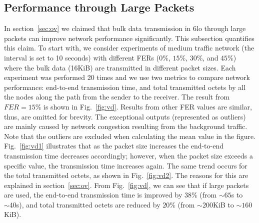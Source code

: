 \documentclass[runningheads,a4paper]{llncs}
\begin{document}
\subsection{Performance through Large Packets} \label{sec:vd}
In section~\ref{sec:ov} we claimed that bulk data transmission in 6lo through large packets can improve network performance significantly. This subsection quantifies this claim. To start with, we consider experiments of medium traffic network (the interval is set to 10 seconds) with different FERs ($0\%$, $15\%$, $30\%$, and $45\%$) where the bulk data (16KiB) are transmitted in different packet sizes. Each experiment was performed 20 times and we use two metrics to compare network performance: end-to-end transmission time, and total transmitted octets by all the nodes along the path from the sender to the receiver. The result from $FER=15\%$ is shown in Fig.~\ref{fig:vd}. Results from other FER values are similar, thus, are omitted for brevity. The exceptional outputs (represented as outliers) are mainly caused by network congestion resulting from the background traffic. Note that the outliers are excluded when calculating the mean value in the figure. Fig.~\ref{fig:vd1} illustrates that as the packet size increases the end-to-end transmission time decreases accordingly; however, when the packet size exceeds a specific value, the transmission time increases again. The same trend occurs for the total transmitted octets, as shown in Fig.~\ref{fig:vd2}. The reasons for this are explained in section~\ref{sec:ov}. From Fig.~\ref{fig:vd}, we can see that if large packets are used, the end-to-end transmission time is improved by $38\%$ (from $\sim 65$s to $\sim 40$s), and total transmitted octets are reduced by $20\%$ (from $\sim 200$KiB to $\sim 160$KiB).
\end{document}
